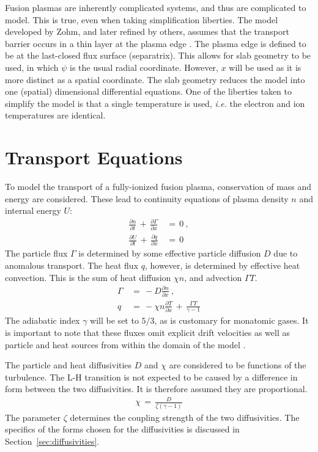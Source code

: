 Fusion plasmas are inherently complicated systems, and thus are complicated to model. This is true, even when taking simplification liberties.
The model developed by Zohm, and later refined by others, assumes that the transport barrier occurs in a thin layer at the plasma edge \cite{zohm_dynamic_1994}.
The plasma edge is defined to be at the last-closed flux surface (separatrix).
This allows for slab geometry to be used, in which $\psi$ is the usual radial coordinate.
However, $x$ will be used as it is more distinct as a spatial coordinate.
The slab geometry reduces the model into one (spatial) dimensional differential equations.
One of the liberties taken to simplify the model is that a single temperature is used, \emph{i.e.} the electron and ion temperatures are identical.\todo{\color{red}{Liberties?}}

\section{Transport Equations}\label{sec:transport_eqs}
To model the transport of a fully-ionized fusion plasma, conservation of mass and energy are considered.
These lead to continuity equations of plasma density $n$ and internal energy $U$:
\begin{align} %
	\frac{\partial n}{\partial t} \,+\, \frac{\partial \Gamma}{\partial x} \,&=\, 0~,\label{eq:n_continuity} \\
	\frac{\partial U}{\partial t} \,+\, \frac{\partial q}{\partial x} \,&=\, 0\label{eq:U_continuity}
\end{align}
The particle flux $\Gamma$ is determined by some effective particle diffusion $D$ due to anomalous transport.
The heat flux $q$, however, is determined by effective heat convection.
This is the sum of heat diffusion $\chi n$, and advection $\Gamma T$. \todo{\color{red}{Check this statement}}
\begin{align} %
	\Gamma \,&=\, -D \frac{\partial n}{\partial x}~,\label{eq:particle_flux} \\
	q \,&=\, -\chi n \frac{\partial T}{\partial x} \,+\, \frac{\Gamma T}{\gamma - 1} \label{eq:heat_flux}
\end{align}
The adiabatic index $\gamma$ will be set to $5/3$, as is customary for monatomic gases.
It is important to note that these fluxes omit explicit drift velocities as well as particle and heat sources from within the domain of the model \cite{zohm_dynamic_1994}.

The particle and heat diffusivities $D$ and $\chi$ are considered to be functions of the turbulence.
The L-H transition is not expected to be caused by a difference in form between the two diffusivities.
It is therefore assumed they are proportional.
\begin{align} %
	\chi \,=\, \frac{D}{\zeta (\gamma - 1)} \label{eq:heat_particle_diff_relation}
\end{align}
The parameter $\zeta$ determines the coupling strength of the two diffusivities. The specifics of the forms chosen for the diffusivities is discussed in Section~\ref{sec:diffusivities}.

